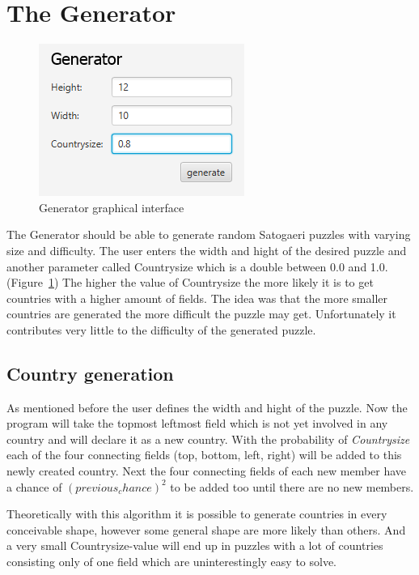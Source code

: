 \section{The Generator} \label{The Generator}
\begin{figure}
  \centering
  \includegraphics[scale=1]{Pictures/generator.png} 
  \caption{Generator graphical interface}
  \label{fig:generator}
\end{figure}
The Generator should be able to generate random Satogaeri puzzles with varying size and difficulty. The user enters the width and hight of the desired puzzle and another parameter called Countrysize which is a double between 0.0 and 1.0. (Figure~\ref{fig:generator}) The higher the value of Countrysize the more likely it is to get countries with a higher amount of fields. The idea was that the more smaller countries are generated the more difficult the puzzle may get. Unfortunately it contributes very little to the difficulty of the generated puzzle.

\subsection{Country generation}
As mentioned before the user defines the width and hight of the puzzle. Now the program will take the topmost leftmost field which is not yet involved in any country and will declare it as a new country. With the probability of \emph{Countrysize} each of the four connecting fields (top, bottom, left, right) will be added to this newly created country. Next the four connecting fields of each new member have a chance of \emph{\((previous_chance)^2\)} to be added too until there are no new members.

Theoretically with this algorithm it is possible to generate countries in every conceivable shape, however some general shape are more likely than others. And a very small Countrysize-value will end up in puzzles with a lot of countries consisting only of one field which are uninterestingly easy to solve.

